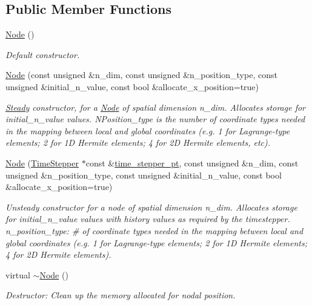 \subsection*{Public Member Functions}
\begin{DoxyCompactItemize}
\item 
\hyperlink{classoomph_1_1Node_af40c4014b1d7f30ed2142330fa5f1e68}{Node} ()
\begin{DoxyCompactList}\small\item\em Default constructor. \end{DoxyCompactList}\item 
\hyperlink{classoomph_1_1Node_aca6c40f3a7bb1943b413a466d32c6970}{Node} (const unsigned \&n\+\_\+dim, const unsigned \&n\+\_\+position\+\_\+type, const unsigned \&initial\+\_\+n\+\_\+value, const bool \&allocate\+\_\+x\+\_\+position=true)
\begin{DoxyCompactList}\small\item\em \hyperlink{classoomph_1_1Steady}{Steady} constructor, for a \hyperlink{classoomph_1_1Node}{Node} of spatial dimension n\+\_\+dim. Allocates storage for initial\+\_\+n\+\_\+value values. N\+Position\+\_\+type is the number of coordinate types needed in the mapping between local and global coordinates (e.\+g. 1 for Lagrange-\/type elements; 2 for 1D Hermite elements; 4 for 2D Hermite elements, etc). \end{DoxyCompactList}\item 
\hyperlink{classoomph_1_1Node_a8a7c3c5e13ba0f434028ed2f93268a6e}{Node} (\hyperlink{classoomph_1_1TimeStepper}{Time\+Stepper} $\ast$const \&\hyperlink{classoomph_1_1Data_a5b34970d16205921dca3ada720da8445}{time\+\_\+stepper\+\_\+pt}, const unsigned \&n\+\_\+dim, const unsigned \&n\+\_\+position\+\_\+type, const unsigned \&initial\+\_\+n\+\_\+value, const bool \&allocate\+\_\+x\+\_\+position=true)
\begin{DoxyCompactList}\small\item\em Unsteady constructor for a node of spatial dimension n\+\_\+dim. Allocates storage for initial\+\_\+n\+\_\+value values with history values as required by the timestepper. n\+\_\+position\+\_\+type\+: \# of coordinate types needed in the mapping between local and global coordinates (e.\+g. 1 for Lagrange-\/type elements; 2 for 1D Hermite elements; 4 for 2D Hermite elements). \end{DoxyCompactList}\item 
virtual \hyperlink{classoomph_1_1Node_afa67d364de717efb1bb8e2b61fc4a29f}{$\sim$\+Node} ()
\begin{DoxyCompactList}\small\item\em Destructor\+: Clean up the memory allocated for nodal position. \end{DoxyCompactList}\item 

\end{DoxyCompactItemize}
